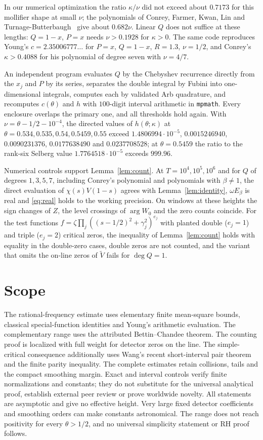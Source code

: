 \documentclass[11pt]{article}
\theoremstyle{remark}
\newcommand{\Vt}{\widetilde V}
\begin{document}
In our numerical optimization the ratio $\kappa/\nu$ did not exceed about
$0.7173$ for this mollifier shape at small $\nu$; the polynomials of Conrey,
Farmer, Kwan, Lin and Turnage-Butterbaugh~\cite{CFKL} give about $0.682\nu$.
Linear $Q$ does not suffice at these lengths: $Q=1-x$, $P=x$ needs
$\nu>0.1928$ for $\kappa>0$. The same code reproduces Young's
$c=2.35006777\ldots$ for $P=x$, $Q=1-x$, $R=1.3$, $\nu=1/2$, and Conrey's
$\kappa>0.4088$ for his polynomial of degree seven with $\nu=4/7$.

An independent program evaluates $Q$ by the Chebyshev recurrence directly
from the $x_j$ and $P$ by its series, separates the double integral by
Fubini into one-dimensional integrals, computes each by validated Arb
quadrature, and recomputes $c(\theta)$ and $h$ with $100$-digit interval
arithmetic in \texttt{mpmath}. Every enclosure overlaps the primary one, and
all thresholds hold again. With $\nu=\theta-1/2-10^{-4}$, the directed values
of $h(\theta;\kappa)$ at $\theta=0.534,0.535,0.54,0.5459,0.55$ exceed
$1.4806994\cdot10^{-5}$, $0.0015246940$, $0.0090231376$, $0.0177638490$ and
$0.0237708528$; at $\theta=0.5459$ the ratio to the rank-six Selberg value
$1.7764518\cdot10^{-5}$ exceeds $999.96$.

Numerical controls support Lemma~\ref{lem:count}. At $T=10^4,10^5,10^6$ and
for $Q$ of degrees $1,3,5,7$, including Conrey's polynomial and polynomials
with $\beta\ne1$, the direct evaluation of $\chi(s)V(1-s)$ agrees with
Lemma~\ref{lem:identity}, $\omega E_\beta$ is real and \eqref{eq:real} holds to
the working precision. On windows at these heights the sign changes of $Z$,
the level crossings of $\arg W_0$ and the zero counts coincide. For the test
functions $f=\zeta\prod_j((s-1/2)^2+\gamma_j^2)^{e_j}$ with planted double
($e_j=1$) and triple ($e_j=2$) critical zeros, the inequality of
Lemma~\ref{lem:count} holds with equality in the double-zero cases, double
zeros are not counted, and the variant that omits the on-line zeros of $\Vt$
fails for $\deg Q=1$.

\section{Scope}
The rational-frequency estimate uses elementary finite mean-square bounds,
classical special-function identities and Young's arithmetic evaluation.
The complementary range uses the attributed Bettin--Chandee theorem.
The counting proof is localized with full weight for detector zeros on
the line. The simple-critical consequence additionally uses Wang's
recent short-interval pair theorem and the finite parity inequality.
The complete estimates retain collisions, tails and the compact smoothing
margin. Exact and interval controls verify finite normalizations and
constants; they do not substitute for the universal analytical proof,
establish external peer review or prove worldwide novelty.
All statements are asymptotic and give no effective height. Very large
fixed detector coefficients and smoothing orders can make constants
astronomical. The range does not reach positivity for every
$\theta>1/2$, and no universal simplicity statement or RH proof follows.
\end{document}
